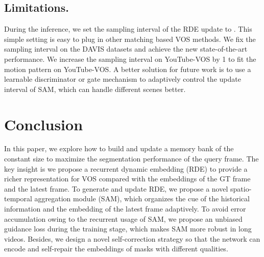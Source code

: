 \documentclass[10pt,twocolumn,letterpaper]{article}
\begin{document}
\begin{table}[t]
	\centering
	\vspace{-0.5em}
	\caption{Ablation of different loss functions without the BL30K \cite{cheng2021modular} pre-training.}
	\label{tab:ablation-loss}
	\vspace{-1em}
\end{table}


\subsection{Limitations.}
During the inference, we set the sampling interval of the RDE update to . This simple setting is easy to plug in other matching based VOS methods. We fix the sampling interval  on the DAVIS datasets and achieve the new state-of-the-art performance. We increase the sampling interval on YouTube-VOS by 1 to fit the motion pattern on YouTube-VOS. 
A better solution for future work is to use a learnable discriminator \cite{goodfellow2020generative} or gate mechanism \cite{yu2019free} to adaptively control the update interval of SAM, which can handle different scenes better.












\section{Conclusion}
In this paper, we explore how to build and update a memory bank of the constant size to maximize the segmentation performance of the query frame. The key insight is we propose a recurrent dynamic embedding (RDE) to provide a richer representation for VOS compared with the embeddings of the GT frame and the latest frame. To generate and update RDE, we propose a novel spatio-temporal aggregation module (SAM), which organizes the cue of the historical information and the embedding of the latest frame adaptively. To avoid error accumulation owing to the recurrent usage of SAM, we propose an unbiased guidance loss during the training stage, which makes SAM more robust in long videos. Besides, we design a novel self-correction strategy so that the network can encode and self-repair the embeddings of masks with different qualities. 
\end{document}
